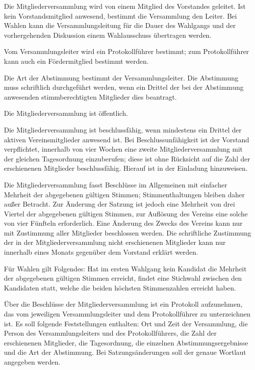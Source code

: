 \documentclass[parskip]{scrartcl}
\begin{document}
\begin{contract}

Die Mitgliederversammlung wird von einem Mitglied des Vorstandes geleitet. Ist kein Vorstandsmitglied anwesend, bestimmt die Versammlung den Leiter. Bei Wahlen kann die Versammlungsleitung für die Dauer des Wahlgangs und der vorhergehenden Diskussion einem Wahlausschuss übertragen werden.

Vom Versammlungsleiter wird ein Protokollführer bestimmt; zum Protokollführer kann auch ein Fördermitglied bestimmt werden.

Die Art der Abstimmung bestimmt der Versammlungsleiter. Die Abstimmung muss schriftlich durchgeführt werden, wenn ein Drittel der bei der Abstimmung anwesenden stimmberechtigten Mitglieder dies beantragt.

Die Mitgliederversammlung ist öffentlich.

Die Mitgliederversammlung ist beschlussfähig, wenn mindestens ein Drittel der aktiven Vereinsmitglieder anwesend ist. Bei Beschlussunfähigkeit ist der Vorstand verpflichtet, innerhalb von vier Wochen eine zweite Mitgliederversammlung mit der gleichen Tagesordnung einzuberufen; diese ist ohne Rücksicht auf die Zahl der erschienenen Mitglieder beschlussfähig. Hierauf ist in der Einladung hinzuweisen.

Die Mitgliederversammlung fasst Beschlüsse im Allgemeinen mit einfacher Mehrheit der abgegebenen gültigen Stimmen; Stimmenthaltungen bleiben daher außer Betracht. Zur Änderung der Satzung ist jedoch eine Mehrheit von drei Viertel der abgegebenen gültigen Stimmen, zur Auflösung des Vereins eine solche von vier Fünfteln erforderlich. Eine Änderung des Zwecks des Vereins kann nur mit Zustimmung aller Mitglieder beschlossen werden. Die schriftliche Zustimmung der in der Mitgliederversammlung nicht erschienenen Mitglieder kann nur innerhalb eines Monats gegenüber dem Vorstand erklärt werden.

Für Wahlen gilt Folgendes: Hat im ersten Wahlgang kein Kandidat die Mehrheit der abgegebenen gültigen Stimmen erreicht, findet eine Stichwahl zwischen den Kandidaten statt, welche die beiden höchsten Stimmenzahlen erreicht haben.

Über die Beschlüsse der Mitgliederversammlung ist ein Protokoll aufzunehmen, das vom jeweiligen Versammlungsleiter und dem Protokollführer zu unterzeichnen ist. Es soll folgende Feststellungen enthalten: Ort und Zeit der Versammlung, die Person des Versammlungsleiters und des Protokollführers, die Zahl der erschienenen Mitglieder, die Tagesordnung, die einzelnen Abstimmungsergebnisse und die Art der Abstimmung. Bei Satzungsänderungen soll der genaue Wortlaut angegeben werden.


\end{contract}
\end{document}
